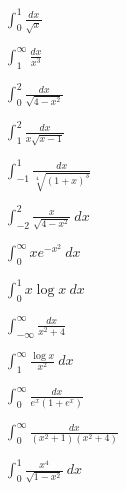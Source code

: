 \documentclass[11pt, uplatex, dvipdfmx]{jsarticle}
\newcommand{\ds}{\displaystyle}
\begin{document}
\begin{edaenumerate}
  \item $\ds \int_{0}^{1} \frac{dx}{\sqrt{x}}$

  \item $\ds \int_{1}^{\infty} \frac{dx}{x^3}$

  \item $\ds \int_{0}^{2} \frac{dx}{\sqrt{4-x^2}}$

  \item $\ds \int_{1}^{2} \frac{dx}{x\sqrt{x-1}}$

  \item $\ds \int_{-1}^{1} \frac{dx}{\sqrt[4]{(1+x)^3}}$

  \item $\ds \int_{-2}^{2} \frac{x}{\sqrt{4-x^2}} \ dx$

  \item $\ds \int_{0}^{\infty} x e^{-x^2} \ dx$

  \item $\ds \int_{0}^{1} x \log x \ dx$

  \item $\ds \int_{-\infty}^{\infty} \frac{dx}{x^2+4}$

  \item $\ds \int_{1}^{\infty}\frac{\log x}{x^2} \ dx$

  \item $\ds \int_{0}^{\infty} \frac{dx}{e^x (1+e^x)}$

  \item $\ds \int_{0}^{\infty}\frac{dx}{(x^2+1)(x^2+4)}$

  \item $\ds \int_{0}^{1} \frac{x^4}{\sqrt{1-x^2}} \ dx$

  \end{edaenumerate}

\newpage
\end{document}
